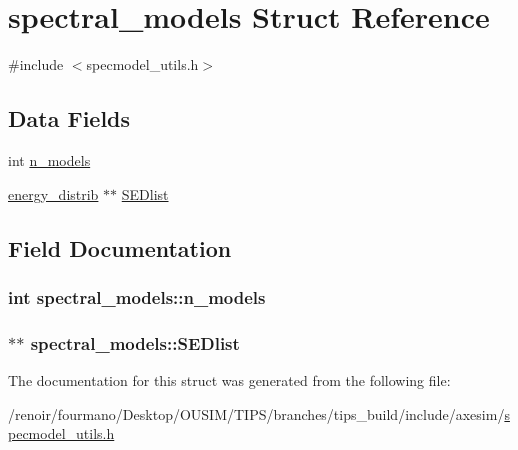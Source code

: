 \hypertarget{structspectral__models}{
\section{spectral\_\-models Struct Reference}
\label{structspectral__models}
}


{\ttfamily \#include $<$specmodel\_\-utils.h$>$}\subsection*{Data Fields}
\begin{DoxyCompactItemize}
\item 
int \hyperlink{structspectral__models_a1e0a38224697819c156efc42a4988faa}{n\_\-models}
\item 
\hyperlink{structenergy__distrib}{energy\_\-distrib} $\ast$$\ast$ \hyperlink{structspectral__models_a72c9e572d91921b9deb60470a0b31161}{SEDlist}
\end{DoxyCompactItemize}


\subsection{Field Documentation}
\hypertarget{structspectral__models_a1e0a38224697819c156efc42a4988faa}{
\subsubsection[{n\_\-models}]{\setlength{\rightskip}{0pt plus 5cm}int {\bf spectral\_\-models::n\_\-models}}}
\label{structspectral__models_a1e0a38224697819c156efc42a4988faa}
\hypertarget{structspectral__models_a72c9e572d91921b9deb60470a0b31161}{
\subsubsection[{SEDlist}]{$\ast$$\ast$ {\bf spectral\_\-models::SEDlist}}}
\label{structspectral__models_a72c9e572d91921b9deb60470a0b31161}


The documentation for this struct was generated from the following file:\begin{DoxyCompactItemize}
\item 
/renoir/fourmano/Desktop/OUSIM/TIPS/branches/tips\_\-build/include/axesim/\hyperlink{specmodel__utils_8h}{specmodel\_\-utils.h}\end{DoxyCompactItemize}
